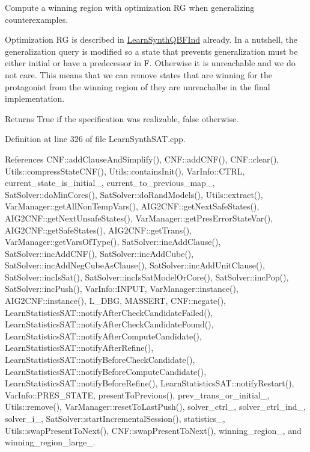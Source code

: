 Compute a winning region with optimization R\-G when generalizing counterexamples. 

Optimization R\-G is described in \hyperlink{classLearnSynthQBFInd}{Learn\-Synth\-Q\-B\-F\-Ind} already. In a nutshell, the generalization query is modified so a state that prevents generalization must be either initial or have a predecessor in F. Otherwise it is unreachable and we do not care. This means that we can remove states that are winning for the protagonist from the winning region of they are unreachalbe in the final implementation.

\begin{DoxyReturn}{Returns}
True if the specification was realizable, false otherwise. 
\end{DoxyReturn}


Definition at line 326 of file Learn\-Synth\-S\-A\-T.\-cpp.



References C\-N\-F\-::add\-Clause\-And\-Simplify(), C\-N\-F\-::add\-C\-N\-F(), C\-N\-F\-::clear(), Utils\-::compress\-State\-C\-N\-F(), Utils\-::contains\-Init(), Var\-Info\-::\-C\-T\-R\-L, current\-\_\-state\-\_\-is\-\_\-initial\-\_\-, current\-\_\-to\-\_\-previous\-\_\-map\-\_\-, Sat\-Solver\-::do\-Min\-Cores(), Sat\-Solver\-::do\-Rand\-Models(), Utils\-::extract(), Var\-Manager\-::get\-All\-Non\-Temp\-Vars(), A\-I\-G2\-C\-N\-F\-::get\-Next\-Safe\-States(), A\-I\-G2\-C\-N\-F\-::get\-Next\-Unsafe\-States(), Var\-Manager\-::get\-Pres\-Error\-State\-Var(), A\-I\-G2\-C\-N\-F\-::get\-Safe\-States(), A\-I\-G2\-C\-N\-F\-::get\-Trans(), Var\-Manager\-::get\-Vars\-Of\-Type(), Sat\-Solver\-::inc\-Add\-Clause(), Sat\-Solver\-::inc\-Add\-C\-N\-F(), Sat\-Solver\-::inc\-Add\-Cube(), Sat\-Solver\-::inc\-Add\-Neg\-Cube\-As\-Clause(), Sat\-Solver\-::inc\-Add\-Unit\-Clause(), Sat\-Solver\-::inc\-Is\-Sat(), Sat\-Solver\-::inc\-Is\-Sat\-Model\-Or\-Core(), Sat\-Solver\-::inc\-Pop(), Sat\-Solver\-::inc\-Push(), Var\-Info\-::\-I\-N\-P\-U\-T, Var\-Manager\-::instance(), A\-I\-G2\-C\-N\-F\-::instance(), L\-\_\-\-D\-B\-G, M\-A\-S\-S\-E\-R\-T, C\-N\-F\-::negate(), Learn\-Statistics\-S\-A\-T\-::notify\-After\-Check\-Candidate\-Failed(), Learn\-Statistics\-S\-A\-T\-::notify\-After\-Check\-Candidate\-Found(), Learn\-Statistics\-S\-A\-T\-::notify\-After\-Compute\-Candidate(), Learn\-Statistics\-S\-A\-T\-::notify\-After\-Refine(), Learn\-Statistics\-S\-A\-T\-::notify\-Before\-Check\-Candidate(), Learn\-Statistics\-S\-A\-T\-::notify\-Before\-Compute\-Candidate(), Learn\-Statistics\-S\-A\-T\-::notify\-Before\-Refine(), Learn\-Statistics\-S\-A\-T\-::notify\-Restart(), Var\-Info\-::\-P\-R\-E\-S\-\_\-\-S\-T\-A\-T\-E, present\-To\-Previous(), prev\-\_\-trans\-\_\-or\-\_\-initial\-\_\-, Utils\-::remove(), Var\-Manager\-::reset\-To\-Last\-Push(), solver\-\_\-ctrl\-\_\-, solver\-\_\-ctrl\-\_\-ind\-\_\-, solver\-\_\-i\-\_\-, Sat\-Solver\-::start\-Incremental\-Session(), statistics\-\_\-, Utils\-::swap\-Present\-To\-Next(), C\-N\-F\-::swap\-Present\-To\-Next(), winning\-\_\-region\-\_\-, and winning\-\_\-region\-\_\-large\-\_\-.



